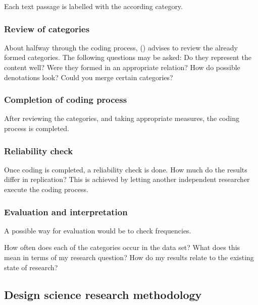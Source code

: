 Each text passage is labelled with the according category.

\subsubsection*{Review of categories}

About halfway through the coding process,
\citeauthor{mayring2019qualitative} (\citeyear{mayring2019qualitative})
advises to review the already formed categories.
The following questions may be asked:
Do they represent the content well?
Were they formed in an appropriate relation?
How do possible denotations look?
Could you merge certain categories?

\subsubsection*{Completion of coding process}

After reviewing the categories,
and taking appropriate measures,
the coding process is completed.

\subsubsection*{Reliability check}

Once coding is completed,
a reliability check is done.
How much do the results differ in replication?
This is achieved by letting another independent researcher
execute the coding process.


\subsubsection*{Evaluation and interpretation}

A possible way for evaluation would be to check frequencies.

How often does each of the categories occur in the data set?
What does this mean in terms of my research question?
How do my results relate to the existing state of research?













\subsection{Design science research methodology}

